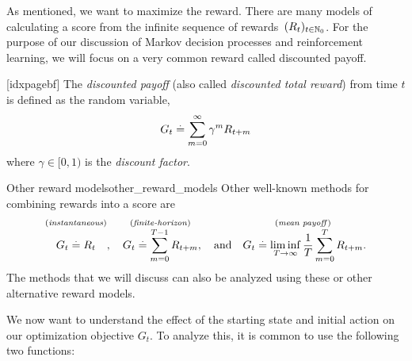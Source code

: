 As mentioned, we want to maximize the reward.
There are many models of calculating a score from the infinite sequence of rewards~$(R_t)_{t\in\mathbb{N}_0}$.
For the purpose of our discussion of Markov decision processes and reinforcement learning, we will focus on a very common reward called discounted payoff.

\begin{defn}[idxpagebf]
  The \emph{discounted payoff} (also called \emph{discounted total reward}) from time $t$ is defined as the random variable, \begin{align}
    G_t \overset{.}{=} \sum_{m=0}^\infty \gamma^m R_{t+m} \label{eq:discounted_payoff}
  \end{align} where $\gamma \in [0, 1)$ is the \emph{discount factor}.
\end{defn}

\begin{rmk}{Other reward models}{other_reward_models}
  Other well-known methods for combining rewards into a score are \begin{align*}
    \overset{\text{(\midx{instantaneous})}}{\vphantom{\sum_{m=0}^M}G_t \defeq R_t},\quad \overset{\text{(\midx{finite-horizon})}}{G_t \defeq \sum_{m=0}^{T-1} R_{t+m}},\quad\text{and}\quad \overset{\text{(\midx{mean payoff})}}{G_t \defeq \liminf_{T\to\infty} \frac{1}{T} \sum_{m=0}^T R_{t+m}}.
  \end{align*}
  The methods that we will discuss can also be analyzed using these or other alternative reward models.
\end{rmk}

We now want to understand the effect of the starting state and initial action on our optimization objective $G_t$.
To analyze this, it is common to use the following two functions:

